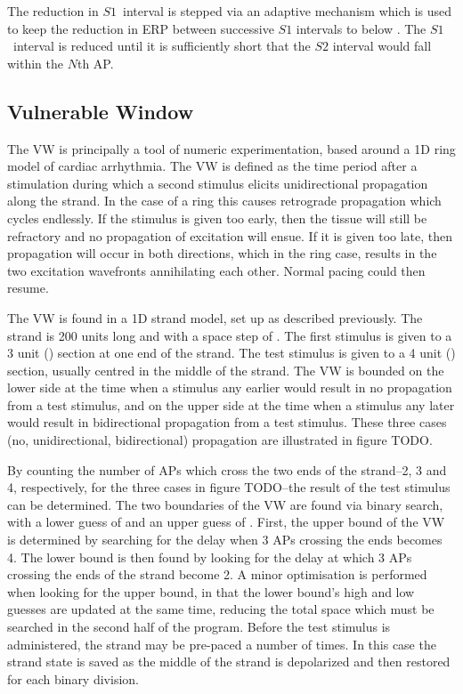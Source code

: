 The reduction in $S1$\ interval is stepped via an adaptive mechanism which is
used to keep the reduction in ERP between successive $S1$ intervals to below
.  The $S1$\ interval is reduced until it is sufficiently short that the
$S2$ interval would fall within the $N$th AP.

\subsection{Vulnerable Window}

The VW is principally a tool of numeric experimentation, based around a 1D ring
model of cardiac arrhythmia.  The VW is defined as the time period after a
stimulation during which a second stimulus elicits unidirectional propagation
along the strand.  In the case of a ring this causes retrograde propagation
which cycles endlessly.  If the stimulus is given too early, then the tissue
will still be refractory and no propagation of excitation will ensue.  If it is
given too late, then propagation will occur in both directions, which in the
ring case, results in the two excitation wavefronts annihilating each other.
Normal pacing could then resume.

The VW is found in a 1D strand model, set up as described previously.  The
strand is 200 units long and with a space step of .  The first stimulus is
given to a 3 unit () section at one end of the strand.  The test stimulus
is given to a 4 unit () section, usually centred in the middle of the
strand. The VW is bounded on the lower side at the time when a stimulus any
earlier would result in no propagation from a test stimulus, and on the upper
side at the time when a stimulus any later would result in bidirectional
propagation from a test stimulus.  These three cases (no, unidirectional,
bidirectional) propagation are illustrated in figure TODO.

By counting the number of APs which cross the two ends of the strand--2, 3 and
4, respectively, for the three cases in figure TODO--the result of the test
stimulus can be determined.  The two boundaries of the VW are found via binary
search, with a lower guess of  and an upper guess of .  First, the
upper bound of the VW is determined by searching for the delay when 3 APs
crossing the ends becomes 4.  The lower bound is then found by looking for the
delay at which 3 APs crossing the ends of the strand become 2.  A minor
optimisation is performed when looking for the upper bound, in that the lower
bound's high and low guesses are updated at the same time, reducing the total
space which must be searched in the second half of the program.  Before the test
stimulus is administered, the strand may be pre-paced a number of times.  In
this case the strand state is saved as the middle of the strand is depolarized
and then restored for each binary division.


